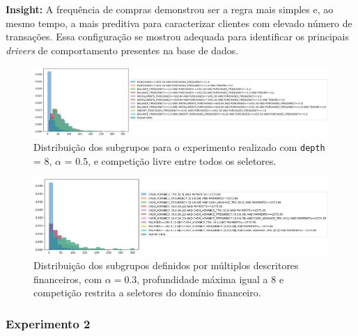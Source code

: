 \documentclass[12pt]{article}
\begin{document}
\textbf{Insight:} A frequência de compras demonstrou ser a regra mais simples e, ao mesmo tempo, a mais preditiva para caracterizar clientes com elevado número de transações. Essa configuração se mostrou adequada para identificar os principais \textit{drivers} de comportamento presentes na base de dados.

\begin{figure}[h] \centering
    \includegraphics[width=1\textwidth]{imagens/experimento1.1.png}
    \caption{Distribuição dos subgrupos para o experimento realizado com \texttt{depth} = 8, $\alpha$ = 0.5, e competição livre entre todos os seletores.}
    \label{fig:experimento11}
\end{figure}

\begin{figure}[h] \centering
    \includegraphics[width=1\textwidth]{imagens/experimento1.2.png}
    \caption{Distribuição dos subgrupos definidos por múltiplos descritores financeiros, com $\alpha = 0.3$, profundidade máxima igual a 8 e competição restrita a seletores do domínio financeiro.}
    \label{fig:experimento3-1}
\end{figure}

\subsubsection*{Experimento 2} \label{sec:exp2}
\end{document}
